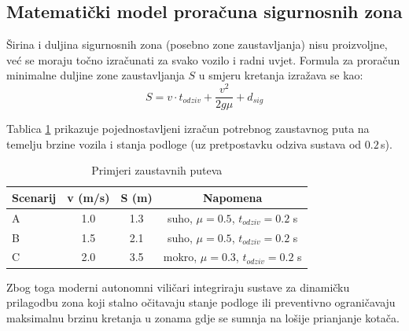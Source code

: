 \subsection{Matematički model proračuna sigurnosnih zona}
Širina i duljina sigurnosnih zona (posebno zone zaustavljanja) nisu proizvoljne, već se moraju točno izračunati za svako vozilo i radni uvjet. Formula za proračun minimalne duljine zone zaustavljanja $S$ u smjeru kretanja izražava se kao:
\begin{equation}
  S = v \cdot t_{odziv} + \frac{v^2}{2 g \mu} + d_{sig}
\end{equation}

Tablica \ref{tab:zaustavni_put} prikazuje pojednostavljeni izračun potrebnog zaustavnog puta na temelju brzine vozila i stanja podloge (uz pretpostavku odziva sustava od $0.2$\,s).

\begin{table}[h]
\centering
\begin{tabular}{lccc}
\hline
Scenarij & v (m/s) & S (m) & Napomena \\
\hline
A & 1.0 & 1.3 & suho, $\mu=0.5$, $t_{odziv}=0.2$ s \\
B & 1.5 & 2.1 & suho, $\mu=0.5$, $t_{odziv}=0.2$ s \\
C & 2.0 & 3.5 & mokro, $\mu=0.3$, $t_{odziv}=0.2$ s \\
\hline
\end{tabular}
\caption{Primjeri zaustavnih puteva}
\label{tab:zaustavni_put}
\end{table}

Zbog toga moderni autonomni viličari integriraju sustave za dinamičku prilagodbu zona koji stalno očitavaju stanje podloge ili preventivno ograničavaju maksimalnu brzinu kretanja u zonama gdje se sumnja na lošije prianjanje kotača.
